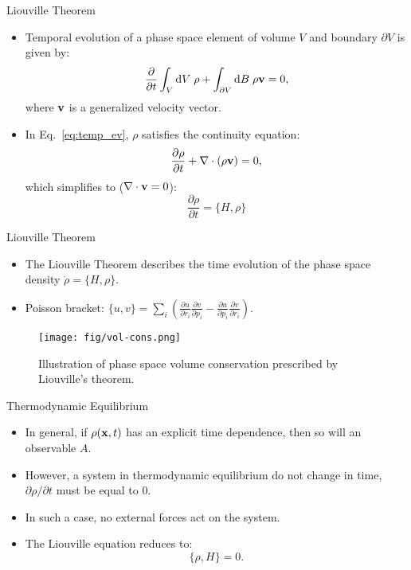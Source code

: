 \documentclass[10pt]{beamer}
\begin{document}
\begin{frame}{Liouville Theorem}
\begin{itemize}
\setlength\itemsep{1em}
  \item Temporal evolution of a phase space element of volume $V$ and boundary $\partial{V}$ is given by:
  \begin{equation}
  \label{eq:temp_ev}
    \frac{\partial}{\partial{t}} \int_V \mathrm{d} V\; \rho
      + \int_{\partial{V}}\mathrm{d} B\; \rho{\bf v} = 0,
  \end{equation}
  where ${\bf v}$ is a generalized velocity vector.

  \item In Eq.~\ref{eq:temp_ev}, $\rho$ satisfies the continuity equation:
  \begin{equation}
    \frac{\partial{\rho}}{\partial{t}} + \nabla\cdot(\rho{\bf v}) = 0,
  \end{equation}
  which simplifies to ($\nabla\cdot{\bf v} = 0$):
  \begin{equation}
    \frac{\partial{\rho}}{\partial{t}} = \{H, \rho\}
  \end{equation}
\end{itemize}
\end{frame}

\begin{frame}{Liouville Theorem}
\begin{itemize}
\setlength\itemsep{1em}
  \item The Liouville Theorem describes the time evolution of the phase space density $\dot{\rho} = \{H, \rho\}$.

  \item Poisson bracket: $\{u,v\} = \sum_i \left( \frac{\partial{u}}{\partial{r}_i}\frac{\partial{v}}{\partial{p}_i} - \frac{\partial{u}}{\partial{p}_i}\frac{\partial{v}}{\partial{r}_i} \right)$.
\end{itemize}
\begin{figure}
\centering
  \texttt{[image: fig/vol-cons.png]}
  \caption{Illustration of phase space volume conservation prescribed by Liouville's theorem.}
\end{figure}
\end{frame}

\begin{frame}{Thermodynamic Equilibrium}
\begin{itemize}
\setlength\itemsep{1em}
  \item In general, if $\rho({\bf x}, t)$ has an explicit time dependence, then so will an observable $A$.
  \item However, a system in thermodynamic equilibrium do not change in time, $\partial{\rho}/\partial{t}$ must be equal to 0.
  \item In such a case, no external forces act on the system.
  \item The Liouville equation reduces to:
  \begin{equation}
    \label{eq:eq-liouville}
    \{ \rho, H \} = 0.
  \end{equation}
\end{itemize}
\end{frame}
\end{document}
